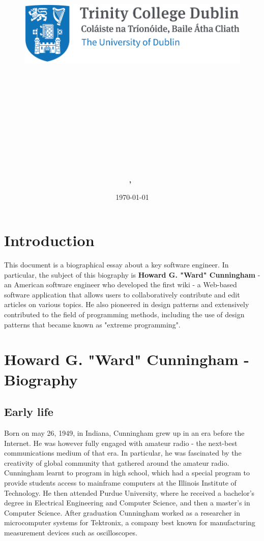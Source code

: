 \documentclass[11pt]{article}
\title{
\vspace{-1in}
\begin{figure}[!ht]
\flushleft
\includegraphics[width=0.4\linewidth]{reduced-trinity.png}
\end{figure}
\vspace{-0.5cm}
\hrulefill \\
\vspace{0.5cm}
\textmd{\textbf{\moduleCode\ \moduleName}}\\
\textmd{\textbf{\assignmentTitle}}\\
\vspace{0.5cm}
\hrulefill \\
}
\author{\textbf{\authorName,\ \authorID}}
\date{\today}
\begin{document}
\lstset{language=Java, captionpos=b, frame=single}
\captionsetup{width=.8\linewidth} 

\maketitle
\tableofcontents
\vspace{0.5in}

\section{Introduction}
\label{sec:Intro}
This document is a biographical essay about a key software engineer. In particular, the subject of this biography is \textbf{Howard G. "Ward" Cunningham} - an American software engineer who developed the first wiki - a Web-based  software  application  that  allows  users  to  collaboratively  contribute  and  edit  articles  on  various  topics.\cite{cs-encyclopedia} He also pioneered in design patterns and extensively contributed to the field of programming methods, including the use of design patterns that became known as "extreme programming".
 
\section{Howard G. "Ward" Cunningham - Biography}
\subsection{Early life}
\par
Born on may 26, 1949, in Indiana, Cunningham grew up in an era before the Internet. He was however fully engaged with amateur radio - the next-best communications medium of that era. In particular, he was fascinated by the creativity of global community that gathered around the amateur radio. Cunningham learnt to program in high school, which had a special program to provide students access to mainframe computers at the Illinois Institute of Technology.\cite{wiki-revolution}\cite{innovators} He then attended Purdue University, where he received a bachelor’s degree in Electrical Engineering and Computer  Science,  and  then  a  master’s  in  Computer  Science. After  graduation  Cunningham  worked  as  a  researcher  in microcomputer  systems  for  Tektronix, a company best known for manufacturing measurement devices such as oscilloscopes. \cite{cs-encyclopedia}
\end{document}
